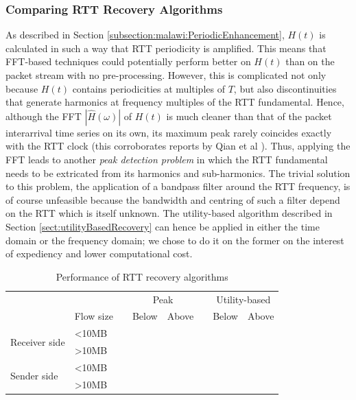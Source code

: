 \subsubsection{Comparing RTT Recovery Algorithms}
\label{sect:comparingRecoveryAlgos}
As described in Section \ref{subsection:malawi:PeriodicEnhancement}, $H(t)$ is calculated in such a way that RTT periodicity is amplified. 
This means that FFT-based techniques could potentially perform better on $H(t)$ than on the packet stream with no pre-processing. 
However, this is complicated not only because $H(t)$ contains periodicities at multiples of $T$, but also discontinuities that generate harmonics at frequency multiples of the RTT fundamental. 
Hence, although the FFT $|\hat{H}(\omega)|$ of $H(t)$ is much cleaner than that of the packet interarrival time series on its own, its maximum peak rarely coincides exactly with the RTT clock (this corroborates reports by Qian et al \cite{Qian:2009p429}). 
Thus, applying the FFT leads to another \emph{peak detection problem} in which the RTT fundamental needs to be extricated from its harmonics and sub-harmonics. 
The trivial solution to this problem, the application of a bandpass filter around the RTT frequency, is of course unfeasible because the bandwidth and 
centring of such a filter depend on the RTT which is itself unknown.
The utility-based algorithm described in Section \ref{sect:utilityBasedRecovery} can hence be applied in either the time domain or the frequency domain; we chose to do it on the former on the interest of expediency and lower computational cost.

\newcommand{\RTTHeader}{Below & Above}
\newcommand{\SmallFlowName}{\textless 10MB}
\newcommand{\LargeFlowName}{\textgreater 10MB} 
\begin{table}
\footnotesize
\centering
\begin{tabular}{ p{1.5cm} p{1.2cm} p{0cm} p{.6cm}p{.6cm} p{0cm} p{.6cm}p{.6cm}}
& & & \multicolumn{2}{c}{Peak} & & \multicolumn{2}{c}{Utility-based} \\
\cline{4-5} \cline{7-8}
& Flow size & & \RTTHeader & & \RTTHeader \\
\cline{4-5} \cline{7-8} 
\multirow{2}{*}{Receiver side}  & \SmallFlowName && \\ 
                                & \LargeFlowName && \\
\multirow{2}{*}{Sender side}    & \SmallFlowName && \\
                                & \LargeFlowName && \\
\end{tabular}
\caption{\label{table:rttRecovery}Performance of RTT recovery algorithms}
\vspace{-3mm}
\end{table}

